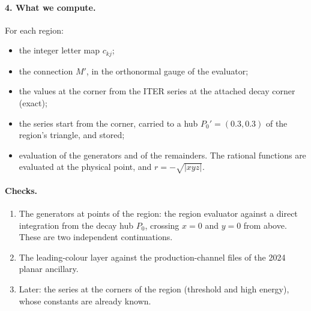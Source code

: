 \documentclass[11pt]{article}
\begin{document}
\paragraph{4. What we compute.} For each region:
\begin{itemize}
\item the integer letter map $c_{kj}$;
\item the connection $M'$, in the orthonormal gauge of the evaluator;
\item the values at the corner from the ITER series at the attached decay corner (exact);
\item the series start from the corner, carried to a hub $P_0'=(0.3,0.3)$ of the region's triangle, and stored;
\item evaluation of the generators and of the remainders. The rational functions are evaluated at the physical point,
  and $r=-\sqrt{|xyz|}$.
\end{itemize}

\paragraph{Checks.}
\begin{enumerate}
\item The generators at points of the region: the region evaluator against a direct integration from the decay hub
  $P_0$, crossing $x=0$ and $y=0$ from above. These are two independent continuations.
\item The leading-colour layer against the production-channel files of the 2024 planar ancillary.
\item Later: the series at the corners of the region (threshold and high energy), whose constants are already known.
\end{enumerate}
\end{document}
